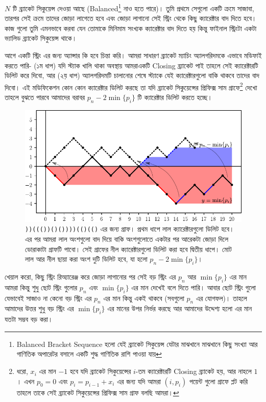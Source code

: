 \begin{example}
$N$ টি ব্র্যাকেট সিকুয়েন্স দেওয়া আছে (Balanced\footnote{Balanced Bracket Sequence হলো যেই ব্র্যাকেট সিকুয়েন্স যেটার মাঝখানে মাঝখানে কিছু সংখ্যা আর গাণিতিক অপারেটর বসালে একটি শুদ্ধ গাণিতিক রাশি পাওয়া যায়} নাও হতে পারে)। তুমি প্রথমে সেগুলো একটি ক্রমে সাজাবা, তারপর সেই ক্রমে তাদের জোড়া  লাগেতে হবে এবং জোড়া লাগানো সেই স্ট্রিং থেকে কিছু ক্যারেক্টার বাদ দিতে হবে। কাজ গুলো তুমি এমনভাবে করবা যেন তোমাকে মিনিমাম সংখ্যক ক্যারেক্টার বাদ দিতে হয় কিন্তু ফাইনাল স্ট্রিংটা একটা ভ্যালিড ব্র্যাকেট সিকুয়েন্স থাকে।
\end{example}
\begin{solution}
আগে একটি স্ট্রিং এর জন্য অ্যান্সার কি হবে চিন্তা করি। আমরা সাধারণ ব্র্যাকেট ম্যাচিং অ্যালগরিদমকে এভাবে মডিফাই করতে পারি- (১ম ধাপ) যদি স্ট্যাক খালি থাকা অবস্থায় আমরাএকটি Closing ব্র্যাকেট পাই তাহলে সেই ক্যারেক্টারটি ডিলিট করে দিবো, আর (২য় ধাপ) অ্যালগরিদমটি চালানোর শেষে স্ট্যাকে যেই ক্যারেক্টারগুলো বাকি থাকবে তাদের বাদ দিবো। এই মডিফিকেশন কোন কোন ক্যারেক্টার ডিলিট করছে তা যদি ব্র্যাকেট সিকুয়েন্সের প্রিফিক্স সাম গ্রাফে\footnote{ধরো, $x_i$ এর মান $-1$ হবে যদি ব্র্যাকেট সিকুয়েন্সের $i$-তম ক্যারেক্টারটি Closing ব্র্যাকেট হয়, আর নাহলে $1$। এখন $p_0 = 0$ এবং $p_i = p_{i-1} + x_i$ এর জন্য যদি আমরা $(i, p_i)$ পয়েন্ট গুলো গ্রাফে প্লট করি তাহলে তাকে সেই ব্র্যাকেট সিকুয়েন্সের প্রিফিক্স সাম গ্রাফ বলছি আমরা।} দেখো তাহলে বুঝতে পারবে আমাদের বরাবর $p_n - 2\min\{p_i\}$ টি ক্যারেক্টার ডিলিট করতে হচ্ছে।
\begin{figure}[h]
  \centering
  \includegraphics[width = \linewidth]{./img/exchange-arg/bracket-sequence.pdf}
  \caption{\texttt{))((())()())))(()(()} এর জন্য গ্রাফ। প্রথম ধাপে লাল ক্যারেক্টারগুলো ডিলিট হবে। এর পর আমরা লাল অংশগুলো বাদ দিয়ে বাকি অংশগুলোতে একটার পর আরেকটা জোড়া দিলে ডোরাকাটা গ্রাফটি পাবো। সেই গ্রাফের নীল ক্যারেক্টারগুলো ডিলিট করা হবে দ্বিতীয় ধাপে। মোট লাল আর নীল ছায়া করা অংশ দুটি  ডিলিট হবে, যা হলো $p_n - 2\min\{p_i\}$।}
\end{figure}
খেয়াল করো, কিছু স্ট্রিং রিঅ্যারেঞ্জ করে জোড়া লাগানোর পর সেই বড় স্ট্রিং এর $p_n$ আর $\min\{p_i\}$ এর মান আমরা কিন্তু শুধু ছোট স্ট্রিং গুলোর $p_n$ এবং $\min\{p_i\}$ এর মান দেখেই বলে দিতে পারি। আবার ছোট স্ট্রিং গুলো যেভাবেই সাজাও না কেনো বড় স্ট্রিং এর $p_n$ এর মান কিন্তু একই থাকবে (সবগুলো $p_n$ এর যোগফল)। তাহলে আমাদের উত্তর শুধু বড় স্ট্রিং এর $\min\{p_i\}$ এর মানের উপর নির্ভর করছে আর আমাদের উদ্দেশ্য হলো এর মান যতটা সম্ভব বড় করা।


\end{solution}
